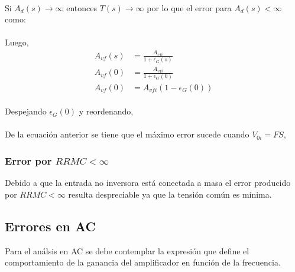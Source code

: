 \paragraph{}
Si $A_d(s)\rightarrow \infty$ entonces $T(s) \rightarrow \infty$ por lo que el error para $A_d(s)<\infty$ como:
\begin{center}
\end{center}
\paragraph{}
Luego,
\begin{align}
    \nonumber
    A_{vf}(s) &= \frac{A_{vfi}}{1 + \epsilon_G(s)} \\
    \nonumber
    A_{vf}(0) &= \frac{A_{vfi}}{1 + \epsilon_G(0)} \\
    \nonumber
    A_{vf}(0) &= A_{vfi}(1-\epsilon_G(0))
\end{align}
\paragraph{}
Despejando $\epsilon_G(0)$ y reordenando,
\begin{center}
\end{center}
\paragraph{}
De la ecuación anterior se tiene que el máximo error sucede cuando $V_{0i}=FS$,
\begin{center}
\end{center}

\subsubsection{Error por $RRMC<\infty$}
\onehalfspacing
Debido a que la entrada no inversora está conectada a masa el error producido por $RRMC<\infty$ resulta despreciable ya que la tensión común es mínima.

\newpage

\subsection{Errores en AC}
\onehalfspacing
Para el análsis en AC se debe contemplar la expresión que define el comportamiento de la ganancia del amplificador en función de la frecuencia.
\begin{center}
\end{center}

